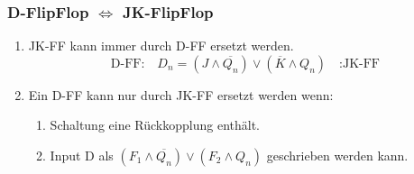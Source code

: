 \subsubsection{D-FlipFlop $\Leftrightarrow$ JK-FlipFlop}
\begin{enumerate}
    \item JK-FF kann immer durch D-FF ersetzt werden.
    \begin{equation*}
        \text{D-FF:}\quad D_n = \left(J \land \overline{Q_n}\right) \lor \left(\overline{K} \land Q_n\right)\quad \text{:JK-FF}
    \end{equation*}
    \item Ein D-FF kann nur durch JK-FF ersetzt werden wenn:
    \begin{enumerate}
        \item Schaltung eine Rückkopplung enthält.
        \item Input D als $\left(F_1 \land \overline{Q_n}\right) \lor \left(F_2 \land Q_n\right)$ geschrieben werden kann.
    \end{enumerate}
\end{enumerate}

